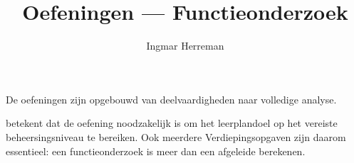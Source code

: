 \documentclass{ximera}
\title{Oefeningen — Functieonderzoek}
\author{Ingmar Herreman}
\begin{document}



\maketitle

\FVDbeginExercises

\begin{opmerking}
De oefeningen zijn opgebouwd van deelvaardigheden naar volledige analyse.

\textbf{\ESS} betekent dat de oefening noodzakelijk is om het
leerplandoel op het vereiste beheersingsniveau te bereiken. Ook meerdere
Verdiepingsopgaven zijn daarom essentieel: een functieonderzoek is meer
dan een afgeleide berekenen.
\end{opmerking}


\end{document}
